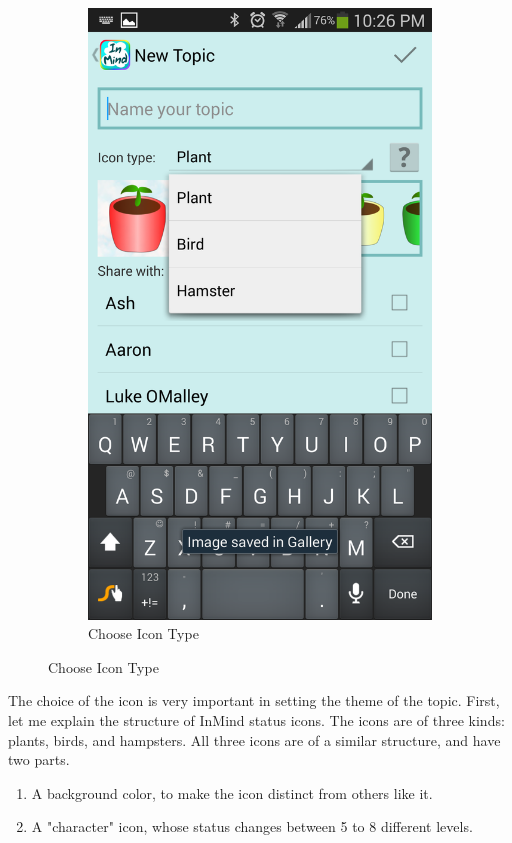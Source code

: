 \begin{figure}
\begin{subfigure}[b]{0.4\textwidth}
      \end{subfigure}
      \begin{subfigure}[b]{0.4\textwidth}
        \includegraphics[width=\textwidth]{topic_create_choose.png}
        \caption{Choose Icon Type}
      \end{subfigure}
      \label{fig:topic_create}
    \end{figure}

      The choice of the icon is very important in setting the theme of the topic.
      First, let me explain the structure of InMind status icons.
      The icons are of three kinds: plants, birds, and hampsters.
      All three icons are of a similar structure, and have two parts.
      \begin{enumerate}
      \item A background color, to make the icon distinct from others like it.
      \item A "character" icon, whose status changes between 5 to 8 different levels.
      \end{enumerate}

